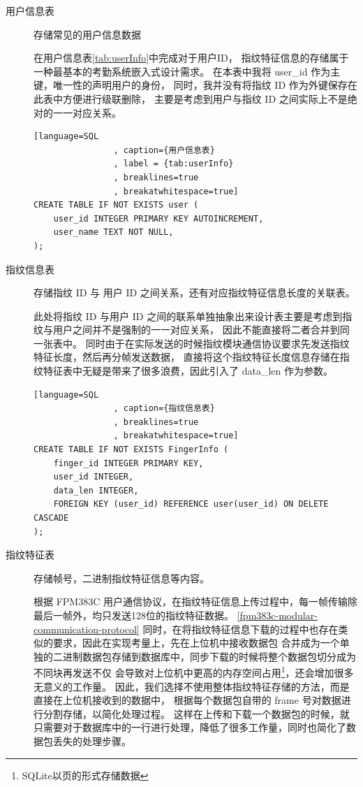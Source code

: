     \begin{description}
        \item[用户信息表] 存储常见的用户信息数据

            在用户信息表\ref{tab:userInfo}中完成对于用户ID，
            指纹特征信息的存储属于一种最基本的考勤系统嵌入式设计需求。
            在本表中我将 user\_id 作为主键，唯一性的声明用户的身份，
            同时，我并没有将指纹 ID 作为外键保存在此表中方便进行级联删除，
            主要是考虑到用户与指纹 ID 之间实际上不是绝对的一一对应关系。

            \begin{lstlisting}[language=SQL
                , caption={用户信息表}
                , label = {tab:userInfo}
                , breaklines=true
                , breakatwhitespace=true]
CREATE TABLE IF NOT EXISTS user (
    user_id INTEGER PRIMARY KEY AUTOINCREMENT,
    user_name TEXT NOT NULL,
);
            \end{lstlisting}
        
        \item[指纹信息表] 存储指纹 ID 与 用户 ID 之间关系，还有对应指纹特征信息长度的关联表。
        
            此处将指纹 ID 与用户 ID 之间的联系单独抽象出来设计表主要是考虑到指纹与用户之间并不是强制的一一对应关系，
            因此不能直接将二者合并到同一张表中。
            同时由于在实际发送的时候指纹模块通信协议要求先发送指纹特征长度，然后再分帧发送数据，
            直接将这个指纹特征长度信息存储在指纹特征表中无疑是带来了很多浪费，因此引入了 data\_len 作为参数。

            \begin{lstlisting}[language=SQL
                , caption={指纹信息表}
                , breaklines=true
                , breakatwhitespace=true]
CREATE TABLE IF NOT EXISTS FingerInfo (
    finger_id INTEGER PRIMARY KEY,
    user_id INTEGER,
    data_len INTEGER,
    FOREIGN KEY (user_id) REFERENCE user(user_id) ON DELETE CASCADE
);
            \end{lstlisting}          

        \item[指纹特征表] 存储帧号，二进制指纹特征信息等内容。
        
            根据 FPM383C 用户通信协议，在指纹特征信息上传过程中，每一帧传输除最后一帧外，均只发送128位的指纹特征数据。
            \ref{fpm383c-modular-communication-protocol}
            同时，在将指纹特征信息下载的过程中也存在类似的要求，因此在实现考量上，先在上位机中接收数据包
            合并成为一个单独的二进制数据包存储到数据库中，同步下载的时候将整个数据包切分成为不同块再发送不仅
            会导致对上位机中更高的内存空间占用\footnote{SQLite以页的形式存储数据}，还会增加很多无意义的工作量。
            因此，我们选择不使用整体指纹特征存储的方法，而是直接在上位机接收到的数据中，
            根据每个数据包自带的 frame 号对数据进行分割存储，以简化处理过程。
            这样在上传和下载一个数据包的时候，就只需要对于数据库中的一行进行处理，降低了很多工作量，同时也简化了数据包丢失的处理步骤。


\end{description}
